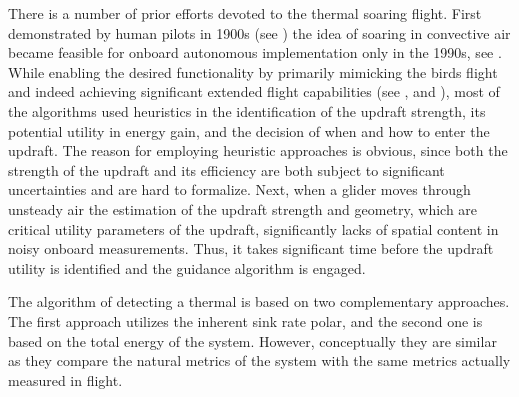 \documentclass{ifacconf}
\begin{document}
There is a number of prior efforts devoted to the thermal soaring flight.
First demonstrated by human pilots in 1900s (see \cite{Simons:1998}) the idea
of soaring in convective air became feasible for onboard autonomous
implementation only in the 1990s, see \cite{Wharington:1998}. While enabling
the desired functionality by primarily mimicking the birds flight and indeed
achieving significant extended flight capabilities (see \cite{Edwards:2008},
\cite{Allen:2006} and \cite{Allen:2007}), most of the algorithms used
heuristics in the identification of the updraft strength, its potential
utility in energy gain, and the decision of when and how to enter the
updraft. The reason for employing heuristic approaches is obvious, since both
the strength of the updraft and its efficiency are both subject to
significant uncertainties and are hard to formalize.
Next, when a glider moves through unsteady air the estimation of the updraft
strength and geometry, which are critical utility parameters of the updraft,
significantly lacks of spatial content in noisy onboard measurements. Thus,
it takes significant time before the updraft utility is identified and the
guidance algorithm is engaged.
%
%

The algorithm of detecting a thermal is based on two complementary
approaches. The first approach utilizes the inherent sink rate polar, and the
second one is based on the total energy of the system. However, conceptually
they are similar as they compare the natural metrics of the system with the
same metrics actually measured in flight.

\end{document}
